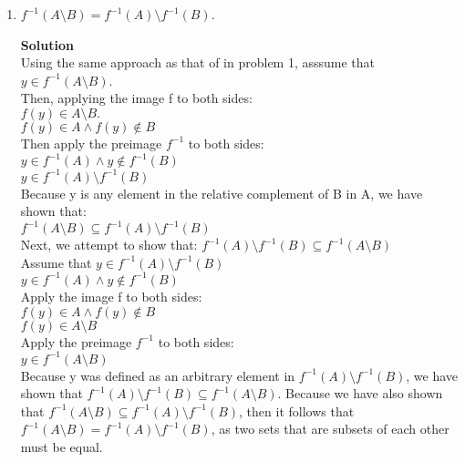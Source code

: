 \documentclass[11pt]{article}
\begin{document}
\begin{enumerate}
\pagebreak 
\item $f^{-1}(A \setminus B) = f^{-1}(A) \setminus f^{-1}(B)$.
\begin{mdframed} \textbf{Solution} \\
Using the same approach as that of in problem 1, asssume that $y \in f^{-1}(A \setminus B)$. \\
Then, applying the image f to both sides: \\
$f(y) \in A \setminus B.$ \\
$f(y) \in A \land f(y) \notin B$ \\
Then apply the preimage $f^{-1}$ to both sides: \\
$y \in f^{-1}(A) \land y \notin f^{-1}(B)$ \\
$y \in f^{-1}(A) \setminus f^{-1}(B)$ \\
Because y is any element in the relative complement of B in A, we have shown that: \\
$f^{-1}(A \setminus B) \subseteq f^{-1}(A) \setminus f^{-1}(B)$ \\
Next, we attempt to show that:
$f^{-1}(A) \setminus f^{-1}(B) \subseteq f^{-1}(A \setminus B)$ \\
Assume that $y \in f^{-1}(A) \setminus f^{-1}(B)$ \\
$y \in f^{-1}(A) \land y \notin f^{-1}(B)$ \\
Apply the image f to both sides: \\
$f(y) \in A \land f(y) \notin B$ \\
$f(y) \in A \setminus B$ \\
Apply the preimage $f^{-1}$ to both sides: \\
$y \in f^{-1}(A \setminus B)$ \\
Because y was defined as an arbitrary element in $f^{-1}(A) \setminus f^{-1}(B)$, we have shown that $f^{-1}(A) \setminus f^{-1}(B) \subseteq f^{-1}(A \setminus B)$. Because we have also shown that $f^{-1}(A \setminus B) \subseteq f^{-1}(A) \setminus f^{-1}(B)$, then it follows that $f^{-1}(A \setminus B) = f^{-1}(A) \setminus f^{-1}(B)$, as two sets that are subsets of each other must be equal.
\end{mdframed}


\end{enumerate}
\end{document}
